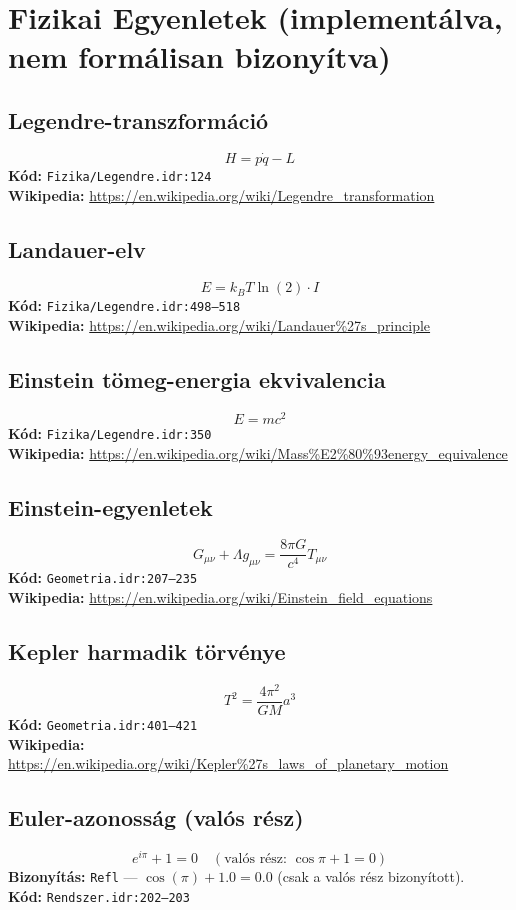 \documentclass[12pt,a4paper]{article}
\begin{document}
\section{Fizikai Egyenletek (implementálva, nem formálisan bizonyítva)}

\subsection{Legendre-transzformáció}
$$H = p\dot{q} - L$$
\textbf{Kód:} \texttt{Fizika/Legendre.idr:124}\\
\textbf{Wikipedia:} \url{https://en.wikipedia.org/wiki/Legendre_transformation}

\subsection{Landauer-elv}
$$E = k_B T \ln(2) \cdot I$$
\textbf{Kód:} \texttt{Fizika/Legendre.idr:498--518}\\
\textbf{Wikipedia:} \url{https://en.wikipedia.org/wiki/Landauer%27s_principle}

\subsection{Einstein tömeg-energia ekvivalencia}
$$E = mc^2$$
\textbf{Kód:} \texttt{Fizika/Legendre.idr:350}\\
\textbf{Wikipedia:} \url{https://en.wikipedia.org/wiki/Mass%E2%80%93energy_equivalence}

\subsection{Einstein-egyenletek}
$$G_{\mu\nu} + \Lambda g_{\mu\nu} = \frac{8\pi G}{c^4} T_{\mu\nu}$$
\textbf{Kód:} \texttt{Geometria.idr:207--235}\\
\textbf{Wikipedia:} \url{https://en.wikipedia.org/wiki/Einstein_field_equations}

\subsection{Kepler harmadik törvénye}
$$T^2 = \frac{4\pi^2}{GM} a^3$$
\textbf{Kód:} \texttt{Geometria.idr:401--421}\\
\textbf{Wikipedia:} \url{https://en.wikipedia.org/wiki/Kepler%27s_laws_of_planetary_motion}

\subsection{Euler-azonosság (valós rész)}
$$e^{i\pi} + 1 = 0 \quad (\text{valós rész: } \cos\pi + 1 = 0)$$
\textbf{Bizonyítás:} \texttt{Refl} — $\cos(\pi) + 1.0 = 0.0$ (csak a valós rész bizonyított).\\
\textbf{Kód:} \texttt{Rendszer.idr:202--203}
\end{document}
